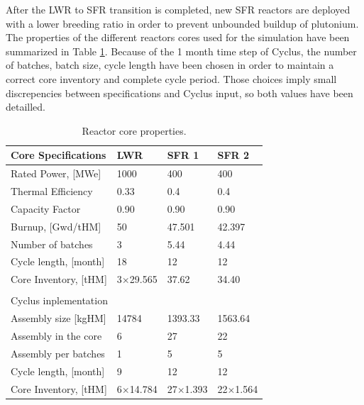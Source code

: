 \documentclass[12pt]{article}
\begin{document}
After the LWR to SFR transition is completed, new SFR reactors are deployed
with a lower breeding ratio in order to prevent unbounded buildup of
plutonium. The properties of the different reactors cores used for the
simulation have been summarized in Table \ref{tab:reactor}. Because of the 1
month time step of Cyclus, the number of batches, batch size, cycle length have been
chosen in order to maintain a correct core inventory and complete cycle
period. Those choices imply small discrepencies between specifications and
Cyclus input, so both values have been detailled.

\begin{table}[h!]
    \centering
    \begin{tabularx}{350pt}{lXXX}
      \hline
      Core Specifications   &  LWR             &  SFR 1            &  SFR 2            \\
      \hline
      Rated Power, [MWe]    &  1000            &  400              &  400              \\
      Thermal Efficiency    &  0.33            &  0.4              &  0.4              \\
      Capacity Factor       &  0.90            &  0.90             &  0.90             \\
      Burnup, [Gwd/tHM]     &  50              &  47.501           &  42.397           \\
      Number of batches     &  3               &  5.44             &  4.44             \\
      Cycle length, [month] &  18              &  12               &  12               \\
      Core Inventory, [tHM] &  3$\times$29.565 &  37.62            &  34.40            \\
                                                                                       \\
      \multicolumn{4}{l}{Cyclus inplementation}                                        \\ 
      \hline
      \hline
      Assembly size [kgHM]  &  14784           &  1393.33          &  1563.64          \\
      Assembly in the core  &  6               &  27               &  22               \\
      Assembly per batches  &  1               &  5                &  5                \\
      Cycle length, [month] &  9               &  12               &  12               \\
      Core Inventory, [tHM] &  6$\times$14.784 &  27$\times$1.393  &  22$\times$1.564  \\
      \hline
    \end{tabularx}
    \caption{Reactor core properties.}
    \label{tab:reactor}
\end{table}
\end{document}

